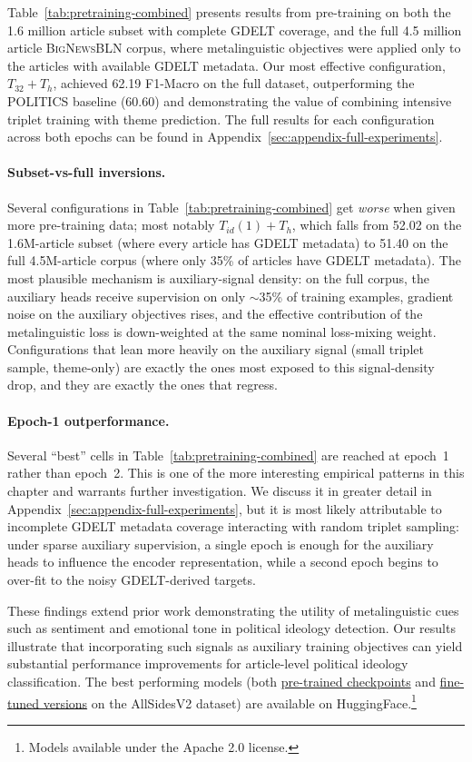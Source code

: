 Table~\ref{tab:pretraining-combined} presents results from pre-training on both the 1.6 million article subset with complete GDELT coverage, and the full 4.5 million article \textsc{BigNewsBLN} corpus, where metalinguistic objectives were applied only to the articles with available GDELT metadata. Our most effective configuration, $T_{32} + T_h$, achieved 62.19 F1-Macro on the full dataset, outperforming the POLITICS baseline (60.60) and demonstrating the value of combining intensive triplet training with theme prediction. The full results for each configuration across both epochs can be found in Appendix~\ref{sec:appendix-full-experiments}.

\paragraph{Subset-vs-full inversions.} Several configurations in Table~\ref{tab:pretraining-combined} get \emph{worse} when given more pre-training data; most notably $T_{id}(1)+T_h$, which falls from 52.02 on the 1.6M-article subset (where every article has GDELT metadata) to 51.40 on the full 4.5M-article corpus (where only 35\% of articles have GDELT metadata). The most plausible mechanism is auxiliary-signal density: on the full corpus, the auxiliary heads receive supervision on only $\sim$35\% of training examples, gradient noise on the auxiliary objectives rises, and the effective contribution of the metalinguistic loss is down-weighted at the same nominal loss-mixing weight. Configurations that lean more heavily on the auxiliary signal (small triplet sample, theme-only) are exactly the ones most exposed to this signal-density drop, and they are exactly the ones that regress.

\paragraph{Epoch-1 outperformance.} Several ``best'' cells in Table~\ref{tab:pretraining-combined} are reached at epoch~1 rather than epoch~2. This is one of the more interesting empirical patterns in this chapter and warrants further investigation. We discuss it in greater detail in Appendix~\ref{sec:appendix-full-experiments}, but it is most likely attributable to incomplete GDELT metadata coverage interacting with random triplet sampling: under sparse auxiliary supervision, a single epoch is enough for the auxiliary heads to influence the encoder representation, while a second epoch begins to over-fit to the noisy GDELT-derived targets.

These findings extend prior work \citep{smirnova2017ideology,bhatia2018topic} demonstrating the utility of metalinguistic cues such as sentiment and emotional tone in political ideology detection. Our results illustrate that incorporating such signals as auxiliary training objectives can yield substantial performance improvements for article-level political ideology classification. The best performing models (both \href{https://huggingface.co/dragonslayer631/roberta_metalinguistic_features_triplet_loss}{pre-trained checkpoints} and \href{https://huggingface.co/dragonslayer631/ideology_classifier_finetuned}{fine-tuned versions} on the AllSidesV2 dataset) are available on HuggingFace.\footnote{Models available under the Apache 2.0 license.}
